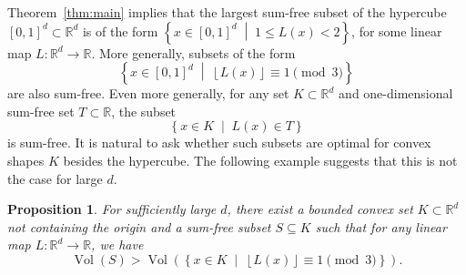 \documentclass{article}
\newcommand{\floor}[1]{\left\lfloor #1 \right\rfloor}
\newcommand{\setcond}[2]{\left\{ #1 \;\middle\vert\; #2 \right\}}
\newcommand{\RR}{\mathbb{R}}
\newtheorem{prop}[thm]{Proposition}
\theoremstyle{definition}
\DeclareMathOperator{\Vol}{Vol}
\begin{document}
Theorem~\ref{thm:main} implies that the largest sum-free subset of the hypercube $[0,1]^d\subset \RR^d$ is of the form $\setcond{x\in [0,1]^d}{1\leq L(x)<2}$, for some linear map $L:\RR^d\to \RR$. More generally, subsets of the form
\[\setcond{x\in [0,1]^d}{\floor{L(x)}\equiv 1\pmod{3}}\]
are also sum-free. Even more generally, for any set $K\subset \RR^d$ and one-dimensional sum-free set $T\subset \RR$, the subset
\begin{equation} \label{eq:sum-free-form}
    \setcond{x\in K}{L(x)\in T}
\end{equation}
is sum-free. It is natural to ask whether such subsets are optimal for convex shapes $K$ besides the hypercube. The following example suggests that this is not the case for large $d$.

\begin{prop}
For sufficiently large $d$, there exist a bounded convex set $K\subset \RR^d$ not containing the origin and a sum-free subset $S\subseteq K$ such that for any linear map $L:\RR^d\to \RR$, we have 
\[\Vol(S) > \Vol(\setcond{x\in K}{\floor{L(x)}\equiv 1\pmod{3}}).\]
\end{prop}
\end{document}

